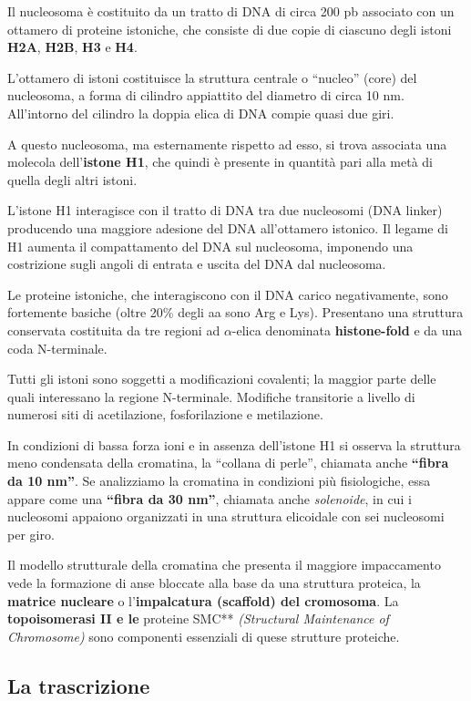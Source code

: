 \documentclass[]{article}
\begin{document}
Il nucleosoma è costituito da un tratto di DNA di circa 200 pb associato
con un ottamero di proteine istoniche, che consiste di due copie di
ciascuno degli istoni \textbf{H2A}, \textbf{H2B}, \textbf{H3} e
\textbf{H4}.

L'ottamero di istoni costituisce la struttura centrale o ``nucleo''
(core) del nucleosoma, a forma di cilindro appiattito del diametro di
circa 10 nm. All'intorno del cilindro la doppia elica di DNA compie
quasi due giri.

A questo nucleosoma, ma esternamente rispetto ad esso, si trova
associata una molecola dell'\textbf{istone H1}, che quindi è presente in
quantità pari alla metà di quella degli altri istoni.

L'istone H1 interagisce con il tratto di DNA tra due nucleosomi (DNA
linker) producendo una maggiore adesione del DNA all'ottamero istonico.
Il legame di H1 aumenta il compattamento del DNA sul nucleosoma,
imponendo una costrizione sugli angoli di entrata e uscita del DNA dal
nucleosoma.

Le proteine istoniche, che interagiscono con il DNA carico
negativamente, sono fortemente basiche (oltre 20\% degli aa sono Arg e
Lys). Presentano una struttura conservata costituita da tre regioni ad
$\alpha$-elica denominata \textbf{histone-fold} e da una coda
N-terminale.

Tutti gli istoni sono soggetti a modificazioni covalenti; la maggior
parte delle quali interessano la regione N-terminale. Modifiche
transitorie a livello di numerosi siti di acetilazione, fosforilazione e
metilazione.

In condizioni di bassa forza ioni e in assenza dell'istone H1 si osserva
la struttura meno condensata della cromatina, la ``collana di perle'',
chiamata anche \textbf{``fibra da 10 nm''}. Se analizziamo la cromatina
in condizioni più fisiologiche, essa appare come una \textbf{``fibra da
30 nm''}, chiamata anche \emph{solenoide}, in cui i nucleosomi appaiono
organizzati in una struttura elicoidale con sei nucleosomi per giro.

Il modello strutturale della cromatina che presenta il maggiore
impaccamento vede la formazione di anse bloccate alla base da una
struttura proteica, la \textbf{matrice nucleare} o l'\textbf{impalcatura
(scaffold) del cromosoma}. La \textbf{topoisomerasi II e le }proteine
SMC** \emph{(Structural Maintenance of Chromosome)} sono componenti
essenziali di quese strutture proteiche.

\subsection{La trascrizione}\label{la-trascrizione}
\end{document}
